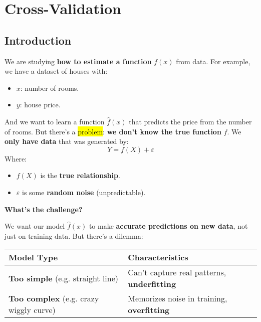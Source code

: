 \section{Cross-Validation}\label{section: Cross-Validation}

\subsection{Introduction}

We are studying \textbf{how to estimate a function} $f(x)$ from data. For example, we have a dataset of houses with:
\begin{itemize}
    \item $x$: number of rooms.
    \item $y$: house price.
\end{itemize}
And we want to learn a function $\hat{f}(x)$ that predicts the price from the number of rooms. But there's a \hl{problem}: \textbf{we don't know the true function} $f$. We \textbf{only have data} that was generated by:
\begin{equation*}
    Y = f(X) + \varepsilon    
\end{equation*}
Where:
\begin{itemize}
    \item $f(X)$ is the \textbf{true relationship}.
    \item $\varepsilon$ is some \textbf{random noise} (unpredictable).
\end{itemize}

\highspace
\begin{flushleft}
    \textcolor{Green3}{ \textbf{What's the challenge?}}
\end{flushleft}
We want our model $\hat{f}(x)$ to make \textbf{accurate predictions on new data}, not just on training data. But there's a dilemma:

\begin{table}[!htp]
    \centering
    \begin{adjustbox}{width={\textwidth},totalheight={\textheight},keepaspectratio}
        \begin{tabular}{@{} l l @{}}
            \toprule
            Model Type & Characteristics \\
            \midrule
            \textbf{Too simple} (e.g. straight line)        & Can't capture real patterns, \textbf{underfitting} \\ [.3em]
            \textbf{Too complex} (e.g. crazy wiggly curve)  & Memorizes noise in training, \textbf{overfitting} \\
            \bottomrule
        \end{tabular}
    \end{adjustbox}
\end{table}

